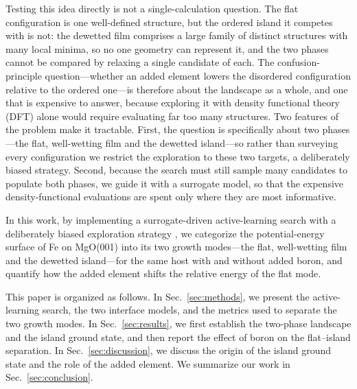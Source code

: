 Testing this idea directly is not a single-calculation question. The flat configuration is one
well-defined structure, but the ordered island it competes with is not: the dewetted film comprises
a large family of distinct structures with many local minima, so no one geometry can represent it,
and the two phases cannot be compared by relaxing a single candidate of each.
The confusion-principle question---whether an added element lowers the disordered configuration
relative to the ordered one---is therefore about the landscape as a whole, and one that is expensive
to answer, because exploring it with density functional theory (DFT) alone would require evaluating
far too many structures. Two features of the problem make it tractable. First, the question is specifically
about two phases---the flat, well-wetting film and the dewetted island---so rather than surveying
every configuration we restrict the exploration to these two targets, a deliberately biased
strategy. Second, because the search must still sample many candidates to populate both phases, we
guide it with a surrogate model, so that the expensive density-functional evaluations are spent only
where they are most informative.

In this work, by implementing a surrogate-driven active-learning search with a deliberately biased
exploration strategy \cite{gofee2017,hamamoto2023}, we categorize the potential-energy surface of Fe
on MgO(001) into its two growth modes---the flat, well-wetting film and the dewetted island---for
the same host with and without added boron, and quantify how the added element shifts the relative
energy of the flat mode.

This paper is organized as follows. In Sec.~\ref{sec:methods}, we present the active-learning
search, the two interface models, and the metrics used to separate the two growth modes. In
Sec.~\ref{sec:results}, we first establish the two-phase landscape and the island ground state, and
then report the effect of boron on the flat--island separation. In Sec.~\ref{sec:discussion}, we
discuss the origin of the island ground state and the role of the added element. We summarize our
work in Sec.~\ref{sec:conclusion}.
